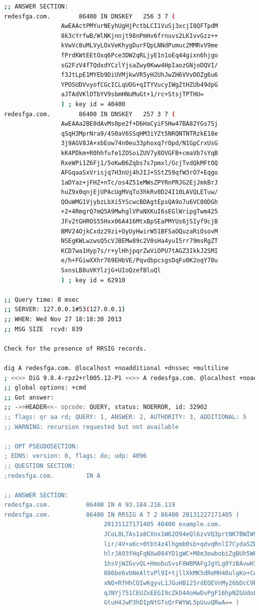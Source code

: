 \documentclass[12pt,openright,a4paper]{report}
\begin{document}
{\begin{lstlisting}[language=bash]
;; ANSWER SECTION:
redesfga.com.        86400 IN DNSKEY   256 3 7 (
                AwEAActPMYurNEyhUgHjPctbLCI1VuSj3xcjI8QFTpdM
                8k3cYrfwB/WlNKjnnjt98nPmHv6frnuvs2LKIvvGzz++
                kVwVc8uMLVyLOxVeKhygDurFQpLNNdPumuc2MMRvV9me
                fPrdKWtEEtOxq6Pce3DW2qRLjyE1n1oEq44gixn6hjgo
                sG2FzV4fTQdxdYCzlYjsaZwy0Kww4HpIaozGNjoDQVI/
                f3JtLpE1MYEb9DiUVMjkwVR5yH2UhJwZH6VVvDOZg6u6
                YPOSUDVvyofCGcICLqUOG+qITYVucyIWgZtHZUb49dpG
                aJTAdVKlOTbYV9sbmHNuMuGt+1/rc+StsjTPTHU=
                ) ; key id = 40400
redesfga.com.        86400 IN DNSKEY   257 3 7 (
                AwEAAa2BE0dAvMs0pe2f+D6HaCyiFSHw47BA82YGs7Sj
                qSqH3MprNra9/4S0aV6SSqHM3iYZt5NRQNTNTRzkE18e
                3j9AGV8JA+xbEow74n0eu33phoxq7rOpd/N1GpCrxUsG
                kK4PDkm+R0hhfufe1ZOSoiZUV7y8OVGFB+cmaVb7sYqB
                RxeWPi1Z6Fj1/5oKwB6Zqbs7s7pmxl/GcjTvdQkMFtOQ
                AFGqaaSxVrisjq7H3nUj4hJIJ+SStZ59qfW3rO7+Eqgo
                1aDYaz+jFHZ+nTc/os4Z51eMWsZPYRnPRJG2EjJmkBrJ
                huZ9x0qnjEjUPAcUgMVqTo3hkRv0D24I10LAVQLETuw/
                QOuWMG1VjybzLbXi5YScwcBDAgtEpsQA9o7u6VC00DGh
                +2+4RmgrQ7mQ5A9MwhglVPaNXKuI6sEGlWripgTwm425
                JFv2tGHROS55Hxx06A416MtxBpSEaPMYUs6jSIyf9cjB
                BMV24OjkCxdz29zi+OyUyHwirW51BFSaOQuzaRiOsovM
                NSEgKWLwzwsQ5cVJBEMw89c2V0sHa4yuI5rr79msRgZT
                KCD7wa1Hyp7s/r+ylHhjpqrZwViOPU7tAGZ3IkkJ2SMI
                e/h+FGiwXXhr769EHbVE/PqvdbpcsgsDqFu0K2oqY70u
                SxnsLB8uVKYlzjG+UIoQzefBluQl
                ) ; key id = 62910

;; Query time: 0 msec
;; SERVER: 127.0.0.1#53(127.0.0.1)
;; WHEN: Wed Nov 27 18:18:30 2013
;; MSG SIZE  rcvd: 839

Check for the presence of RRSIG records.

dig A redesfga.com. @localhost +noadditional +dnssec +multiline
; <<>> DiG 9.8.4-rpz2+rl005.12-P1 <<>> A redesfga.com. @localhost +noadditional +dnssec +multiline
;; global options: +cmd
;; Got answer:
;; ->>HEADER<<- opcode: QUERY, status: NOERROR, id: 32902
;; flags: qr aa rd; QUERY: 1, ANSWER: 2, AUTHORITY: 3, ADDITIONAL: 5
;; WARNING: recursion requested but not available

;; OPT PSEUDOSECTION:
; EDNS: version: 0, flags: do; udp: 4096
;; QUESTION SECTION:
;redesfga.com.         IN A

;; ANSWER SECTION:
redesfga.com.          86400 IN A 93.184.216.119
redesfga.com.          86400 IN RRSIG A 7 2 86400 20131227171405 (
                            20131127171405 40400 example.com.
                            JCoL8L7As1a8CXnx1W62O94eQl6zvVQ3prtNK7BWIW9O
                            lir/4V+a6c+0tbt4z4lhgmb0sb+qdvqRnlI7CydaSZDb
                            hlrJA93fHqFqNXw084YD1gWC+M8m3ewbobiZgBUh5W66
                            1hsVjWZGvvQL+HmobuSvsF8WBMAFgJgYLg0YzBAvwHIk
                            886be6vbNeAltvPl9I+tjllXkMK5dReMH40ulgKo+Cwb
                            xNQ+RfHhCQIwKgyvL1JGuHB125rdEQEVnMy26bDcC9R+
                            qJNYj751CEUZxEEGI9cZkD44oHwDvPgF16hpNZGUdo8P
                            GtuH4JwP3hDIpNtGTsQrFWYWL5pUuuQRwA== )


\end{lstlisting}}
\end{document}
